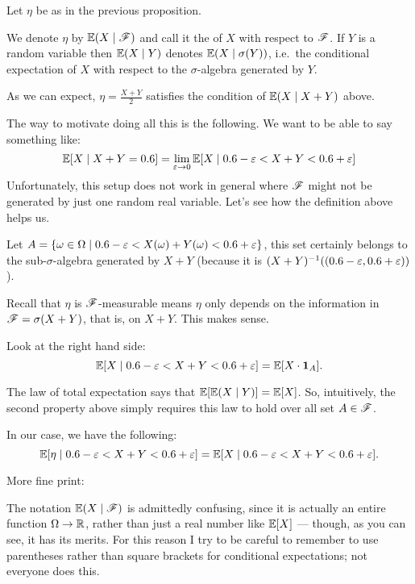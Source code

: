 \begin{definition}
	Let $\eta$ be as in the previous proposition.
	\begin{itemize}
		\ii We denote $\eta$ by $\mathbb E(X \mid \mathscr F)$
		and call it the  of $X$ with respect to $\mathscr F$.
		\ii If $Y$ is a random variable then
		$\mathbb E(X \mid Y)$ denotes $\mathbb E(X \mid \sigma(Y))$,
		i.e.\ the conditional expectation of $X$
		with respect to the $\sigma$-algebra generated by $Y$.
	\end{itemize}
\end{definition}

\begin{example}
	As we can expect, $\eta = \frac{X+Y}{2}$ satisfies the condition of $\mathbb E(X \mid X+Y)$ above.

	The way to motivate doing all this is the following. We want to be able to say
	something like:
	\[ \mathbb E[X \mid X+Y=0.6] = \lim_{\varepsilon \to 0} \mathbb E[X \mid 0.6-\varepsilon < X+Y < 0.6+\varepsilon] \]
	Unfortunately, this setup does not work in general where $\mathscr F$ might not be
	generated by just one random real variable.
	Let's see how the definition above helps us.
	\begin{itemize}
		\ii Let $A = \{\omega \in \Omega \mid 0.6-\varepsilon < X(\omega)+Y(\omega) < 0.6+\varepsilon\}$,
		this set certainly belongs to the sub-$\sigma$-algebra generated by $X+Y$
		(because it is $(X+Y)^{-1}((0.6-\varepsilon, 0.6+\varepsilon))$).

		\ii Recall that $\eta$ is $\mathscr F$-measurable means $\eta$ only depends on the information in
		$\mathscr F = \sigma(X+Y)$, that is, on $X+Y$. This makes sense.

		\ii Look at the right hand side:
		\[ \mathbb E[X \mid 0.6-\varepsilon < X+Y < 0.6+\varepsilon] = \mathbb E[X \cdot \mathbf{1}_A]. \]

		The law of total expectation says that $\mathbb E[\mathbb E(X \mid Y)] = \mathbb E[X]$.
		So, intuitively, the second property above simply requires
		this law to hold over all set $A \in \mathscr F$.

		In our case, we have the following:
		\[ \mathbb E[\eta \mid 0.6-\varepsilon < X+Y < 0.6+\varepsilon] = \mathbb E[X \mid 0.6-\varepsilon < X+Y < 0.6+\varepsilon]. \]
	\end{itemize}
\end{example}

More fine print:
\begin{remark}
	The notation $\mathbb E(X \mid \mathscr F)$ is admittedly confusing,
	since it is actually an entire function $\Omega \to \mathbb R$,
	rather than just a real number like $\mathbb E[X]$ --- though, as you can see, it has its merits.
	For this reason I try to be careful to remember
	to use parentheses rather than square brackets
	for conditional expectations; not everyone does this.
\end{remark}

